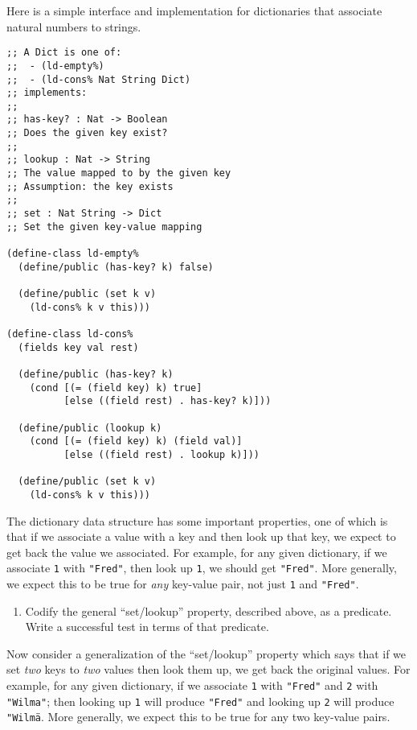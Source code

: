 \documentclass[12pt]{article}                   %
\def\pts#1{\marginpar{\footnotesize \raggedright  \fbox{#1 {\sc Points}}}}
\newcommand\code[1]{\texttt{#1}}
\begin{document}
\begin{problem} \pts{??}
%
Here is a simple interface and implementation for dictionaries that
associate natural numbers to strings.

\begin{verbatim}
;; A Dict is one of:
;;  - (ld-empty%)
;;  - (ld-cons% Nat String Dict)
;; implements:
;;
;; has-key? : Nat -> Boolean
;; Does the given key exist?
;;
;; lookup : Nat -> String
;; The value mapped to by the given key
;; Assumption: the key exists
;;
;; set : Nat String -> Dict
;; Set the given key-value mapping

(define-class ld-empty%
  (define/public (has-key? k) false)

  (define/public (set k v)
    (ld-cons% k v this)))

(define-class ld-cons%
  (fields key val rest)

  (define/public (has-key? k)
    (cond [(= (field key) k) true]
          [else ((field rest) . has-key? k)]))

  (define/public (lookup k)
    (cond [(= (field key) k) (field val)]
          [else ((field rest) . lookup k)]))

  (define/public (set k v)
    (ld-cons% k v this)))
\end{verbatim}

The dictionary data structure has some important properties, one of
which is that if we associate a value with a key and then look up that
key, we expect to get back the value we associated.  For example, for
any given dictionary, if we associate \code{1} with \code{"Fred"},
then look up \code{1}, we should get \code{"Fred"}.  More generally,
we expect this to be true for \emph{any} key-value pair, not just
\code{1} and \code{"Fred"}.

\begin{enumerate}
\item Codify the general ``set/lookup'' property, described above, as
  a predicate.  Write a successful test in terms of that predicate.
\end{enumerate}

Now consider a generalization of the ``set/lookup'' property which
says that if we set \emph{two} keys to \emph{two} values then look
them up, we get back the original values.  For example, for any given
dictionary, if we associate \code{1} with \code{"Fred"} and \code{2}
with \code{"Wilma"}; then looking up \code{1} will produce
\code{"Fred"} and looking up \code{2} will produce \code{"Wilma\"}.
More generally, we expect this to be true for any two key-value pairs.


\end{problem}
\end{document}
